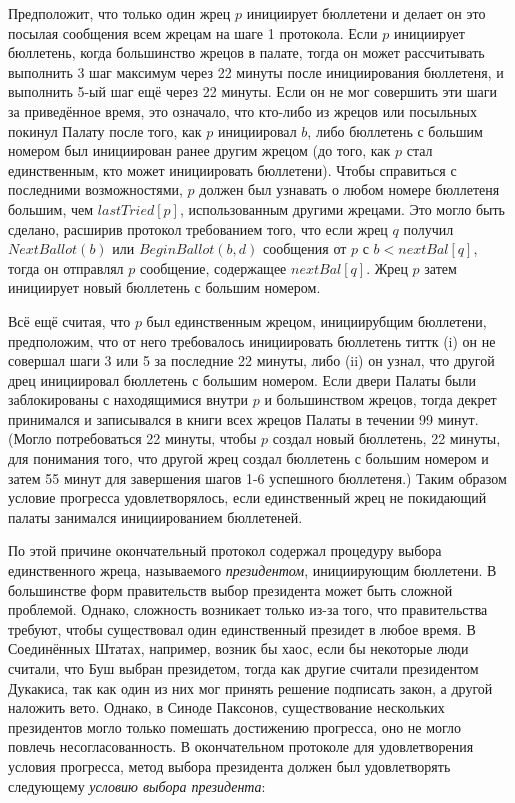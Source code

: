 \documentclass[12pt, a4paper]{article} %
\begin{document}
Предположит, что только один жрец $p$ инициирует бюллетени и делает он это посылая сообщения всем жрецам на шаге 1 протокола. Если $p$ инициирует бюллетень, когда большинство жрецов в палате, тогда он может рассчитывать выполнить 3 шаг максимум через 22 минуты после инициирования бюллетеня, и выполнить 5-ый шаг ещё через 22 минуты. Если он не мог совершить эти шаги за приведённое время, это означало, что кто-либо из жрецов или посыльных покинул Палату после того, как $p$ инициировал $b$, либо бюллетень с большим номером был инициирован ранее другим жрецом (до того, как $p$ стал единственным, кто может инициировать бюллетени). Чтобы справиться с последними возможностями, $p$ должен был узнавать о любом номере бюллетеня большим, чем $lastTried[p]$, использованным другими жрецами. Это могло быть сделано, расширив протокол требованием того, что если жрец $q$ получил $NextBallot(b)$ или $BeginBallot(b, d)$ сообщения от $p$ с $b < nextBal[q]$, тогда он отправлял $p$ сообщение, содержащее $nextBal[q]$. Жрец $p$ затем инициирует новый бюллетень с большим номером.

Всё ещё считая, что $p$ был единственным жрецом, инициирубщим бюллетени, предположим, что от него требовалось инициировать бюллетень титтк (i) он не совершал шаги 3 или 5 за последние 22 минуты, либо (ii) он узнал, что другой дрец инициировал бюллетень с большим номером. Если двери Палаты были заблокированы с находящимися внутри $p$ и большинством жрецов, тогда декрет принимался и записывался в книги всех жрецов Палаты в течении 99 минут. (Могло потребоваться 22 минуты, чтобы $p$ создал новый бюллетень, 22 минуты, для понимания того, что другой жрец создал бюллетень с большим номером и затем 55 минут для завершения шагов 1-6 успешного бюллетеня.) Таким образом условие прогресса удовлетворялось, если единственный жрец не покидающий палаты занимался инициированием бюллетеней.

По этой причине окончательный протокол содержал процедуру выбора единственного жреца, называемого \textit{президентом}, инициирующим бюллетени. В большинстве форм правительств выбор президента может быть сложной проблемой. Однако, сложность возникает только из-за того, что правительства требуют, чтобы существовал один единственный президет в любое время. В Соединённых Штатах, например, возник бы хаос, если бы некоторые люди считали, что Буш выбран президетом, тогда как другие считали президентом Дукакиса, так как один из них мог принять решение подписать закон, а другой наложить вето. Однако, в Синоде Паксонов, существование нескольких президентов могло только помешать достижению прогресса, оно не могло повлечь несогласованность. В окончательном протоколе для удовлетворения условия прогресса, метод выбора президента должен был удовлетворять следующему \textit{условию выбора президента}:
\end{document}
